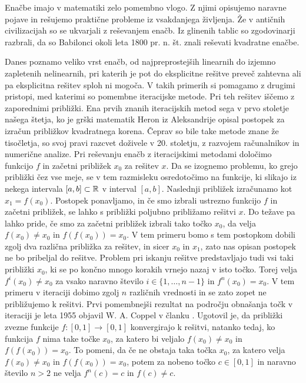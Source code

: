 \documentclass[../TG_magistrsko_delo_sections.tex]{subfiles}
\begin{document}
Enačbe imajo v matematiki zelo pomembno vlogo. Z njimi opisujemo naravne pojave in rešujemo praktične probleme iz vsakdanjega življenja. Že v antičnih civilizacijah so se ukvarjali z reševanjem enačb. Iz glinenih tablic so zgodovinarji razbrali, da so Babilonci okoli leta 1800 pr. n. št. znali reševati kvadratne enačbe.

Danes poznamo veliko vrst enačb, od najpreprostejših linearnih do izjemno zapletenih nelinearnih, pri katerih je pot do eksplicitne rešitve preveč zahtevna ali pa eksplicitna rešitev sploh ni mogoča. V takih primerih si pomagamo z drugimi pristopi, med katerimi so pomembne iteracijske metode. Pri teh rešitev iščemo z zaporednimi približki. Ena prvih znanih iteracijskih metod sega v prvo stoletje našega štetja, ko je grški matematik Heron iz Aleksandrije opisal postopek za izračun približkov kvadratnega korena. Čeprav so bile take metode znane že tisočletja, so svoj pravi razcvet doživele v 20. stoletju, z razvojem računalnikov in numerične analize. Pri reševanju enačb z iteracijskimi metodami določimo funkcijo $f$ in začetni približek $x_0$ za rešitev $x$. Da se izognemo problemu, ko grejo približki čez vse meje, se v tem razmisleku osredotočimo na funkcije, ki slikajo iz nekega intervala $[a, b] \subset \mathbb R$ v interval $[a, b]$. Naslednji približek izračunamo kot $x_1 = f(x_0)$. Postopek ponavljamo, in če smo izbrali ustrezno funkcijo $f$ in začetni približek, se lahko s približki poljubno približamo rešitvi $x$. Do težave pa lahko pride, če smo za začetni približek izbrali tako točko $x_0$, da velja $f(x_0) \neq x_0$ in $f(f(x_0)) = x_0$. V tem primeru bomo s tem postopkom dobili zgolj dva različna približka za rešitev, in sicer $x_0$ in $x_1$, zato nas opisan postopek ne bo pribeljal do rešitve. Problem pri iskanju rešitve predstavljajo tudi vsi taki približki $x_0$, ki se po končno mnogo korakih vrnejo nazaj v isto točko. Torej velja $f^i(x_0) \neq x_0$ za vsako naravno število $i \in \{1, \dots, n-1\}$ in $f^n(x_0) = x_0$. V tem primeru v iteraciji dobimo zgolj $n$ različnih vrednosti in se zato zopet ne približujemo k rešitvi. Prvi pomembnejši rezultat na področju obnašanja točk v iteraciji je leta 1955 objavil W. A. Coppel v članku \cite{conrad}. Ugotovil je, da približki zvezne funkcije $f : [0, 1] \to [0, 1]$ konvergirajo k rešitvi, natanko tedaj, ko funkcija $f$ nima take točke $x_0$, za katero bi veljalo $f(x_0) \neq x_0$ in $f(f(x_0)) = x_0$. To pomeni, da če ne obstaja taka točka $x_0$, za katero velja $f(x_0) \neq x_0$ in $f(f(x_0)) = x_0$, potem za nobeno točko $c \in [0, 1]$ in naravno število $n >2$ ne velja $f^n(c) = c$ in $f(c) \neq c$.
\end{document}
